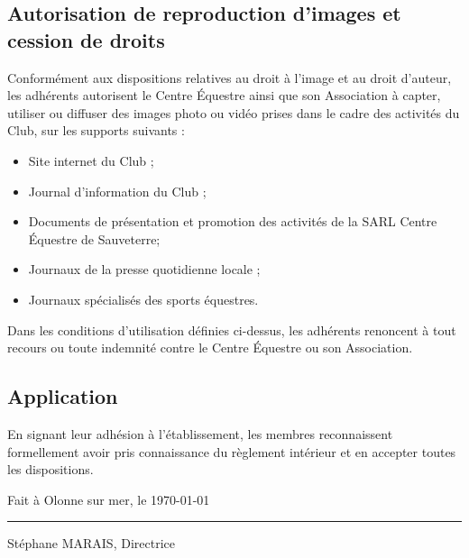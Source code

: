 \documentclass[11pt,a4paper]{article}
\begin{document}
\subsection{Autorisation de reproduction d'images et cession de droits}
Conformément aux dispositions relatives au droit à l'image et au droit d'auteur, les adhérents autorisent le Centre Équestre ainsi que son Association à capter, utiliser ou diffuser des images photo ou vidéo prises dans le cadre des activités du Club, sur les supports suivants :
\begin{itemize}
\item
Site internet du Club ;
\item
Journal d'information du Club ;
\item
Documents de présentation et promotion des activités de la SARL Centre Équestre de Sauveterre;
\item
Journaux de la presse quotidienne locale ;
\item
Journaux spécialisés des sports équestres.
\end{itemize}
Dans les conditions d'utilisation définies ci-dessus, les adhérents renoncent à tout recours ou toute indemnité contre le Centre Équestre ou son Association.

\subsection{Application}
En signant leur adhésion à l'établissement, les membres reconnaissent formellement avoir pris connaissance du règlement intérieur et en accepter toutes les dispositions.

\vfill

Fait à Olonne sur mer, le \today

\vspace{2cm}

\begin{flushright}
\rule{6cm}{0.5pt}

{Stéphane MARAIS, Directrice \kern 9pt}

\end{flushright}
\end{document}

